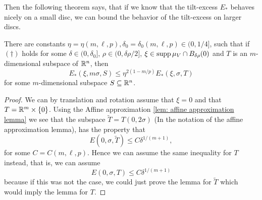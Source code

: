 Then the following theorem says, that if we know that the tilt-excess $E_*$ behaves nicely on a small disc, we can bound the behavior of the tilt-excess on larger discs.
\begin{theorem}\label{thm: tilt-excess decay theorem}
There are constants $\eta=\eta(m,\ell,p),\delta_0=\delta_0(m,\ell,p) \in (0,1/4]$, such that if $(\dagger)$ holds for some $\delta \in (0,\delta_0]$, $\rho \in (0,\delta\rho/2]$, $\xi \in \operatorname{supp}\mu_V \cap B_{\delta\rho}(0)$ and $T$ is an $m$-dimensional subspace of $\mathbb{R}^n$, then
\[
    E_{*}(\xi,m\sigma,S) \le \eta^{2(1-m/p)}E_{*}(\xi,\sigma,T)
\]
for some $m$-dimensional subspace $S \subseteq \mathbb{R}^n$.
\end{theorem}
\begin{proof}
We can by translation and rotation assume that $\xi = 0$ and that $T = \mathbb{R}^m \times \{0\}$. Using the Affine approximation \cref{lem: affine approximation lemma} we see that the subspace $\tilde T = T(0,2\sigma)$ (In the notation of the affine approximation lemma), has the property that
\begin{equation}
    E(0,\sigma,\tilde T) \le C\delta^{1/(m+1)},\label{eq: tefsfd}
\end{equation}
for some $C=C(m,\ell,p)$. Hence we can assume the same inequality for $T$ instead, that is, we can assume
\begin{equation}
    E(0,\sigma, T) \le C\delta^{1/(m+1)}\label{eq: te1}
\end{equation}
because if this was not the case, we could just prove the lemma for $\tilde T$ which would imply the lemma for $T$.


\end{proof}
